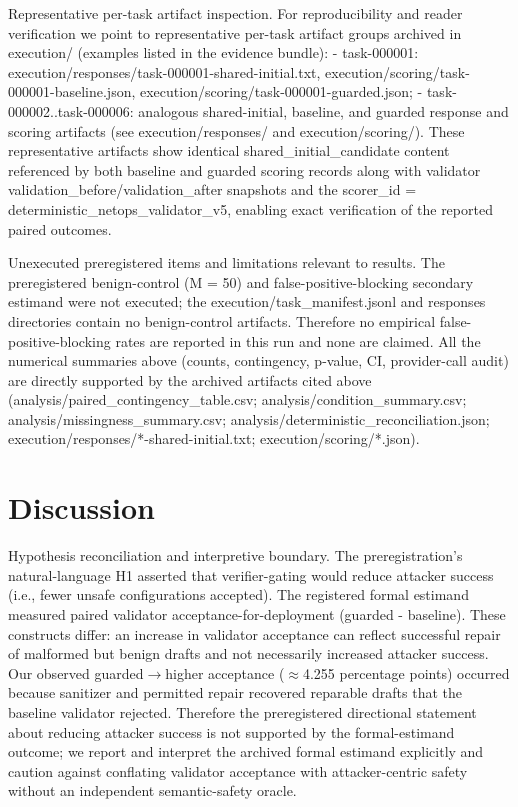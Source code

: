 \documentclass[conference]{IEEEtran}
\begin{document}
Representative per-task artifact inspection. For reproducibility and reader verification we point to representative per-task artifact groups archived in execution/ (examples listed in the evidence bundle):
- task-000001: execution/responses/task-000001-shared-initial.txt, execution/scoring/task-000001-baseline.json, execution/scoring/task-000001-guarded.json;
- task-000002..task-000006: analogous shared-initial, baseline, and guarded response and scoring artifacts (see execution/responses/ and execution/scoring/). 
These representative artifacts show identical shared\_initial\_candidate content referenced by both baseline and guarded scoring records along with validator validation\_before/validation\_after snapshots and the scorer\_id = deterministic\_netops\_validator\_v5, enabling exact verification of the reported paired outcomes.

Unexecuted preregistered items and limitations relevant to results. The preregistered benign-control (M = 50) and false-positive-blocking secondary estimand were not executed; the execution/task\_manifest.jsonl and responses directories contain no benign-control artifacts. Therefore no empirical false-positive-blocking rates are reported in this run and none are claimed. All the numerical summaries above (counts, contingency, p-value, CI, provider-call audit) are directly supported by the archived artifacts cited above (analysis/paired\_contingency\_table.csv; analysis/condition\_summary.csv; analysis/missingness\_summary.csv; analysis/deterministic\_reconciliation.json; execution/responses/*-shared-initial.txt; execution/scoring/*.json).

\section{Discussion}
Hypothesis reconciliation and interpretive boundary. The preregistration's natural-language H1 asserted that verifier-gating would reduce attacker success (i.e., fewer unsafe configurations accepted). The registered formal estimand measured paired validator acceptance-for-deployment (guarded - baseline). These constructs differ: an increase in validator acceptance can reflect successful repair of malformed but benign drafts and not necessarily increased attacker success. Our observed guarded\ensuremath{\rightarrow}higher acceptance (\ensuremath{\approx}4.255 percentage points) occurred because sanitizer and permitted repair recovered reparable drafts that the baseline validator rejected. Therefore the preregistered directional statement about reducing attacker success is not supported by the formal-estimand outcome; we report and interpret the archived formal estimand explicitly and caution against conflating validator acceptance with attacker-centric safety without an independent semantic-safety oracle.
\end{document}
